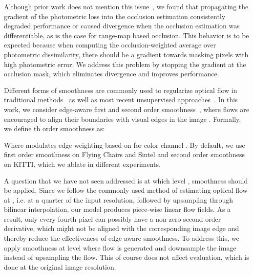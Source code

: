 \documentclass[runningheads]{llncs}
\begin{document}
 Although prior work does not mention this issue~\cite{wang2018occlusion}, we found that propagating the gradient of the photometric loss into the occlusion estimation consistently degraded performance or caused divergence when the occlusion estimation was differentiable, as is the case for range-map based occlusion. This behavior is to be expected because when computing the occlusion-weighted average over photometric dissimilarity, there should be a gradient towards masking pixels with high photometric error. We address this problem by stopping the gradient at the occlusion mask, which eliminates divergence and improves performance.

 Different forms of smoothness are commonly used to regularize optical flow in traditional methods~\cite{Brox04,Horn1981,Sun2010} as well as most recent unsupervised approaches~\cite{jjyu2016unsupflow,ren2017unsupervised,wang2018occlusion,meister2018unflow,yin2018geonet,zou2018dfnet,ranjan2019cvpr,Janai2018ECCV,wang2018unos,Zhong2019UnsupervisedDE}. In this work, we consider edge-aware first and second order smoothness~\cite{tomasi1998bilateral}, where flows are encouraged to align their boundaries with visual edges in the image . Formally, we define th order smoothness as:

Where  modulates edge weighting based on  for color channel . By default, we use first order smoothness on Flying Chairs and Sintel and second order smoothness on KITTI, which we ablate in different experiments.

 A question that we have not seen addressed is at which level , smoothness should be applied. Since we follow the commonly used method of estimating optical flow at , i.e. at a quarter of the input resolution, followed by upsampling through bilinear interpolation, our model produces piece-wise linear flow fields. As a result, only every fourth pixel can possibly have a non-zero second order derivative, which might not be aligned with the corresponding image edge and thereby reduce the effectiveness of edge-aware smoothness. To address this, we apply smoothness at level  where flow is generated and downsample the image instead of upsampling the flow. This of course does not affect evaluation, which is done at the original image resolution.
\end{document}
